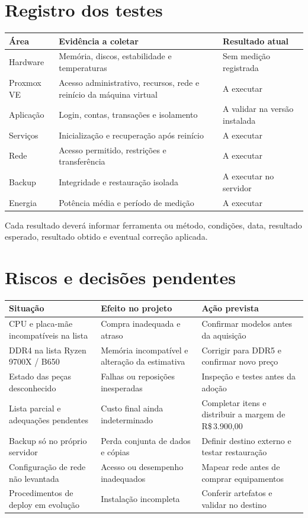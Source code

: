 \documentclass[11pt,a4paper,oneside]{report}
\newcommand{\dinheiro}[1]{R\$\,#1}
\begin{document}
\section{Registro dos testes}
\begin{tabularx}{\textwidth}{@{}p{3.5cm}YY@{}}
\toprule
Área & Evidência a coletar & Resultado atual \\
\midrule
Hardware & Memória, discos, estabilidade e temperaturas & Sem medição registrada \\
Proxmox VE & Acesso administrativo, recursos, rede e reinício da máquina virtual & A executar \\
Aplicação & Login, contas, transações e isolamento & A validar na versão instalada \\
Serviços & Inicialização e recuperação após reinício & A executar \\
Rede & Acesso permitido, restrições e transferência & A executar \\
Backup & Integridade e restauração isolada & A executar no servidor \\
Energia & Potência média e período de medição & A executar \\
\bottomrule
\end{tabularx}
Cada resultado deverá informar ferramenta ou método, condições, data,
resultado esperado, resultado obtido e eventual correção aplicada.

\section{Riscos e decisões pendentes}
\begin{tabularx}{\textwidth}{@{}p{4cm}YY@{}}
\toprule
Situação & Efeito no projeto & Ação prevista \\
\midrule
CPU e placa-mãe incompatíveis na lista & Compra inadequada e atraso & Confirmar modelos antes da aquisição \\
DDR4 na lista Ryzen 9700X / B650 & Memória incompatível e alteração da estimativa & Corrigir para DDR5 e confirmar novo preço \\
Estado das peças desconhecido & Falhas ou reposições inesperadas & Inspeção e testes antes da adoção \\
Lista parcial e adequações pendentes & Custo final ainda indeterminado & Completar itens e distribuir a margem de \dinheiro{3.900,00} \\
Backup só no próprio servidor & Perda conjunta de dados e cópias & Definir destino externo e testar restauração \\
Configuração de rede não levantada & Acesso ou desempenho inadequados & Mapear rede antes de comprar equipamentos \\
Procedimentos de deploy em evolução & Instalação incompleta & Conferir artefatos e validar no destino \\
\bottomrule
\end{tabularx}
\end{document}
